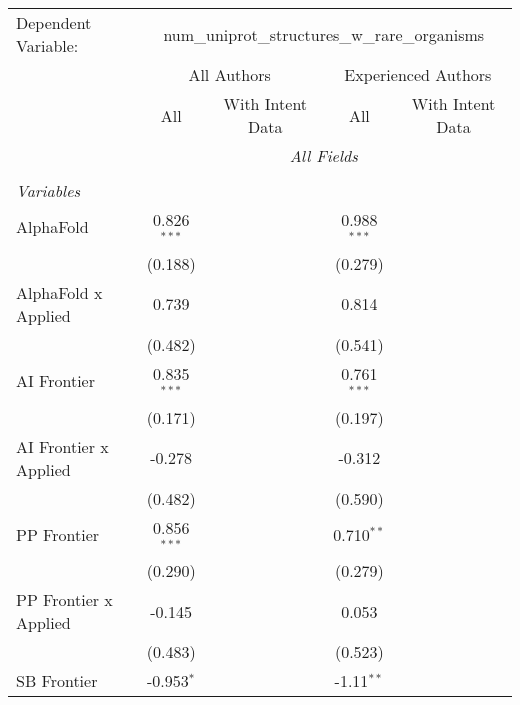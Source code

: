 \begingroup
\centering
\begin{tabular}{lcccccc}
   \tabularnewline \midrule \midrule
   Dependent Variable: & \multicolumn{6}{c}{num\_uniprot\_structures\_w\_rare\_organisms}\\
 & \multicolumn{3}{c}{All Authors} & \multicolumn{3}{c}{Experienced Authors} \\
\cmidrule(lr){2-4} \cmidrule(lr){5-7}
 & \multicolumn{1}{c}{All} & \multicolumn{2}{c}{With Intent Data} & \multicolumn{1}{c}{All} & \multicolumn{2}{c}{With Intent Data} \\
\cmidrule(lr){2-2} \cmidrule(lr){3-4} \cmidrule(lr){5-5} \cmidrule(lr){6-7}
 & \multicolumn{6}{c}{\textit{All Fields}} \\ \\
   \emph{Variables}\\
   AlphaFold             & 0.826$^{***}$ &         &         & 0.988$^{***}$ &        &   \\   
                         & (0.188)       &         &         & (0.279)       &        &   \\   
   AlphaFold x Applied   & 0.739         &         &         & 0.814         &        &   \\   
                         & (0.482)       &         &         & (0.541)       &        &   \\   
   AI Frontier           & 0.835$^{***}$ &         &         & 0.761$^{***}$ &        &   \\   
                         & (0.171)       &         &         & (0.197)       &        &   \\   
   AI Frontier x Applied & -0.278        &         &         & -0.312        &        &   \\   
                         & (0.482)       &         &         & (0.590)       &        &   \\   
   PP Frontier           & 0.856$^{***}$ &         &         & 0.710$^{**}$  &        &   \\   
                         & (0.290)       &         &         & (0.279)       &        &   \\   
   PP Frontier x Applied & -0.145        &         &         & 0.053         &        &   \\   
                         & (0.483)       &         &         & (0.523)       &        &   \\   
   SB Frontier           & -0.953$^{*}$  &         &         & -1.11$^{**}$  &        &   \\   

\end{tabular}
